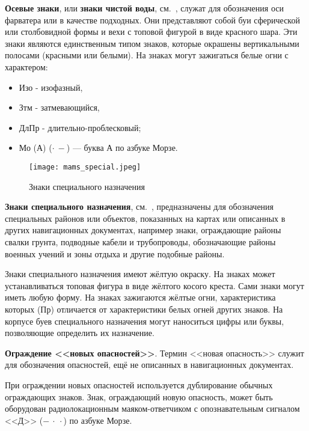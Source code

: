 \textbf{Осевые знаки}, или \textbf{знаки чистой воды},
см.~, служат для обозначения оси фарватера или в
качестве подходных. Они представляют собой буи сферической или
столбовидной формы и вехи с топовой фигурой в виде красного шара. Эти
знаки являются единственным типом знаков, которые окрашены
вертикальными полосами (красными или белыми).  На знаках могут
зажигаться белые огни с характером:
\begin{itemize}
\item Изо - изофазный,
\item Зтм - затмевающийся,
\item ДлПр - длительно-проблесковый;
\item Мо (А) ($\cdot\ -$) — буква А по азбуке Морзе.
\end{itemize}

\begin{figure}[htb]
  \centering{}
  \texttt{[image: mams\_special.jpeg]}
  \caption{Знаки специального назначения}
  \label{fig:mams-special}
\end{figure}

\textbf{Знаки специального назначения}, см.~,
предназначены для обозначения специальных районов или объектов,
показанных на картах или описанных в других навигационных документах,
например знаки, ограждающие районы свалки грунта, подводные кабели и
трубопроводы, обозначающие районы военных учений и зоны отдыха и
другие подобные районы.

Знаки специального назначения имеют жёлтую окраску. На знаках может
устанавливаться топовая фигура в виде жёлтого косого креста. Сами
знаки могут иметь любую форму. На знаках зажигаются жёлтые огни,
характеристика которых (Пр) отличается от характеристики белых огней
других знаков.  На корпусе буев специального назначения могут
наноситься цифры или буквы, позволяющие определить их назначение.

\textbf{Ограждение <<новых опасностей>>}.
Термин <<новая опасность>> служит для обозначения опасностей,
ещё не описанных в навигационных документах.

При ограждении новых опасностей используется дублирование обычных
ограждающих знаков. Знак, ограждающий новую опасность, может быть
оборудован радиолокационным маяком-ответчиком с опознавательным
сигналом <<Д>> ($-\ \cdot\ \cdot$) по азбуке Морзе.

